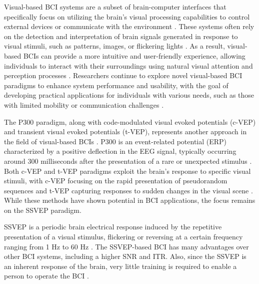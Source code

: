 Visual-based BCI systems are a subset of brain-computer interfaces that specifically focus on utilizing the brain's visual processing capabilities to control external devices or communicate with the environment \cite{allison2007brain}. These systems often rely on the detection and interpretation of brain signals generated in response to visual stimuli, such as patterns, images, or flickering lights \cite{mullerputz2005steadystate}. As a result, visual-based BCIs can provide a more intuitive and user-friendly experience, allowing individuals to interact with their surroundings using natural visual attention and perception processes \cite{cecotti2011spelling}. Researchers continue to explore novel visual-based BCI paradigms to enhance system performance and usability, with the goal of developing practical applications for individuals with various needs, such as those with limited mobility or communication challenges \cite{guger2009many}.

The P300 paradigm, along with code-modulated visual evoked potentials (c-VEP) and transient visual evoked potentials (t-VEP), represents another approach in the field of visual-based BCIs \cite{wolpaw2012brain}. P300 is an event-related potential (ERP) characterized by a positive deflection in the EEG signal, typically occurring around 300 milliseconds after the presentation of a rare or unexpected stimulus \cite{sutton1965evoked}. Both c-VEP and t-VEP paradigms exploit the brain's response to specific visual stimuli, with c-VEP focusing on the rapid presentation of pseudorandom sequences \cite{sutter1992brain} and t-VEP capturing responses to sudden changes in the visual scene \cite{bin2009online}. While these methods have shown potential in BCI applications, the focus remains on the SSVEP paradigm.

SSVEP is a periodic brain electrical response induced by the repetitive presentation of a visual stimulus, flickering or reversing at a certain frequency ranging from 1 Hz to 60 Hz \cite{zhu2010survey}. The SSVEP-based BCI has many advantages over other BCI systems, including a higher SNR and ITR. Also, since the SSVEP is an inherent response of the brain, very little training is required to enable a person to operate the BCI \cite{bakardjian2010optimization}.


